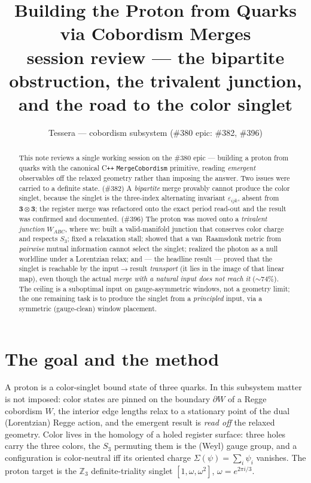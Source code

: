 \documentclass[11pt]{article}
\title{\bf Building the Proton from Quarks via Cobordism Merges\\
\large session review --- the bipartite obstruction, the trivalent junction,
and the road to the color singlet}
\author{Tessera --- cobordism subsystem (\#380 epic: \#382, \#396)}
\date{}
\newcommand{\Z}{\mathbb{Z}}
\newcommand{\rep}[1]{\mathbf{#1}}
\newcommand{\Sg}{\Sigma}
\newcommand{\code}[1]{\texttt{#1}}
\begin{document}
\maketitle

\begin{abstract}
This note reviews a single working session on the \#380 epic --- building a proton
from quarks with the canonical C\texttt{++} \code{MergeCobordism} primitive,
reading \emph{emergent} observables off the relaxed geometry rather than imposing
the answer. Two issues were carried to a definite state. (\#382) A \emph{bipartite}
merge provably cannot produce the color singlet, because the singlet is the
three-index alternating invariant $\varepsilon_{ijk}$, absent from
$\rep 3\otimes\rep 3$; the register merge was refactored onto the exact period
read-out and the result was confirmed and documented. (\#396) The proton was moved
onto a \emph{trivalent junction} $W_{ABC}$, where we: built a valid-manifold
junction that conserves color charge and respects $S_3$; fixed a relaxation stall;
showed that a van~Raamsdonk metric from \emph{pairwise} mutual information cannot
select the singlet; realized the photon as a null worldline under a Lorentzian
relax; and --- the headline result --- proved that the singlet is reachable by the
input$\to$result \emph{transport} (it lies in the image of that linear map), even
though the actual \emph{merge with a natural input does not reach it} ($\sim 74\%$).
The ceiling is a suboptimal input on gauge-asymmetric windows, not a geometry
limit; the one remaining task is to produce the singlet from a \emph{principled}
input, via a symmetric (gauge-clean) window placement.
\end{abstract}

\section{The goal and the method}

A proton is a color-singlet bound state of three quarks. In this subsystem matter
is not imposed: color states are pinned on the boundary $\partial W$ of a Regge
cobordism $W$, the interior edge lengths relax to a stationary point of the dual
(Lorentzian) Regge action, and the emergent result is \emph{read off} the relaxed
geometry. Color lives in the homology of a holed register surface: three holes
carry the three colors, the $S_3$ permuting them is the (Weyl) gauge group, and a
configuration is color-neutral iff its oriented charge $\Sg(\psi)=\sum_i\psi_i$
vanishes. The proton target is the $\Z_3$ definite-triality singlet
$[1,\omega,\omega^2]$, $\omega=e^{2\pi i/3}$.
\end{document}
